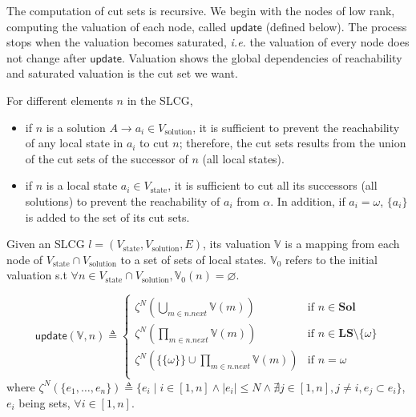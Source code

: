 The computation of cut sets is recursive.
We begin with the nodes of low rank, computing the valuation of each node, called $\mathsf{update}$ (defined below).
The process stops when the valuation becomes saturated, \textit{i.e.} the valuation of every node does not change after $\mathsf{update}$.
Valuation shows the global dependencies of reachability and saturated valuation is the cut set we want.

For different elements $n$ in the SLCG,  

\begin{itemize}
\item if $n$ is a solution $A\to a_i \in V_{\mathrm{solution}}$, it is sufficient to prevent the reachability of any local state in $a_i$ to cut $n$; therefore, the cut sets results from the union
of the cut sets of the successor of $n$ (all local states).
\item if $n$ is a local state $a_i\in V_{\mathrm{state}}$, it is sufficient to cut all its successors (all solutions) to prevent the reachability of $a_i$ from $\alpha$. 
In addition, if $a_i=\omega$, $\{a_i\}$ is added to the set of its cut sets.
\end{itemize}

\begin{definition}[Valuation]\label{def:valuation}
Given an SLCG $l= (V_{\mathrm{state}},V_{\mathrm{solution}},E)$, its valuation $\mathbb{V}$ is a mapping from each node of $V_{\mathrm{state}}\cap V_{\mathrm{solution}}$ to a set of sets of local states.
$\mathbb{V}_0$ refers to the initial valuation s.t $\forall n \in V_{\mathrm{state}}\cap V_{\mathrm{solution}}, \mathbb{V}_0(n)=\varnothing$.
\end{definition}


\begin{definition}
\begin{equation}  
\mathsf{update}(\mathbb{V},n)\triangleq 
      \begin{cases}
            \zeta^N(\bigcup_{m\in n.next}\mathbb{V}(m))&\text{if } n\in\mathbf{Sol}\\
            \zeta^N(\prod_{m\in n.next}\mathbb{V}(m))&\text{if } n\in\mathbf{LS}\setminus\{\omega\}\\
            \zeta^N(\{\{\omega\}\}\cup\prod_{m\in n.next}\mathbb{V}(m))&\text{if }n=\omega\\
      \end{cases}
\end{equation}
where $\zeta^N(\{e_1,\ldots,e_n\})\triangleq\{e_i\mid i\in[1,n]\land |e_i|\leq N\land\nexists j\in[1,n],j\neq i,e_j\subset e_i\}$, $e_i$ being sets, $\forall i\in[1,n]$.
\end{definition}

